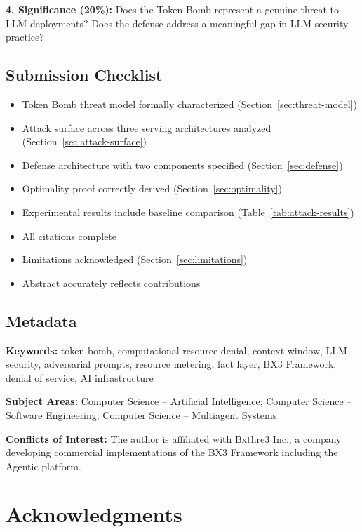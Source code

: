 \documentclass[12pt]{article}
\begin{document}
\textbf{4. Significance (20\%):} Does the Token Bomb represent a genuine threat to LLM deployments? Does the defense address a meaningful gap in LLM security practice?

\subsection*{Submission Checklist}

\begin{itemize}
    \item[ ] Token Bomb threat model formally characterized (Section~\ref{sec:threat-model})
    \item[ ] Attack surface across three serving architectures analyzed (Section~\ref{sec:attack-surface})
    \item[ ] Defense architecture with two components specified (Section~\ref{sec:defense})
    \item[ ] Optimality proof correctly derived (Section~\ref{sec:optimality})
    \item[ ] Experimental results include baseline comparison (Table~\ref{tab:attack-results})
    \item[ ] All citations complete
    \item[ ] Limitations acknowledged (Section~\ref{sec:limitations})
    \item[ ] Abstract accurately reflects contributions
\end{itemize}

\subsection*{Metadata}

\textbf{Keywords:} token bomb, computational resource denial, context window, LLM security, adversarial prompts, resource metering, fact layer, BX3 Framework, denial of service, AI infrastructure

\textbf{Subject Areas:} Computer Science -- Artificial Intelligence; Computer Science -- Software Engineering; Computer Science -- Multiagent Systems

\textbf{Conflicts of Interest:} The author is affiliated with Bxthre3 Inc., a company developing commercial implementations of the BX3 Framework including the Agentic platform.

\section*{Acknowledgments}
\end{document}

